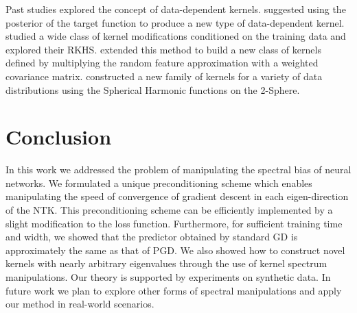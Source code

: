 \documentclass[10pt]{article} %
\theoremstyle{plain}
\theoremstyle{definition}
\theoremstyle{remark}
\begin{document}
Past studies explored the concept of data-dependent kernels. \citet{simon2022kernel} suggested using the posterior of the target function to produce a new type of data-dependent kernel. \citet{sindhwani2005beyond} studied a wide class of kernel modifications conditioned on the training data and explored their RKHS. \citet{ionescu2017large} extended this method to build a new class of kernels defined by multiplying the random feature approximation with a weighted covariance matrix. \citet{kennedy2013classification} constructed a new family of kernels for a variety of data distributions using the Spherical Harmonic functions on the 2-Sphere.

\section{Conclusion}

In this work we addressed the problem of manipulating the spectral bias of neural networks. We formulated a unique preconditioning scheme which enables manipulating the speed of convergence of gradient descent in each eigen-direction of the NTK. This preconditioning scheme can be efficiently implemented by a slight modification to the loss function.  Furthermore, for sufficient training time and width, we showed that the predictor obtained by standard GD is approximately the same as that of PGD. We also showed how to construct novel kernels with nearly arbitrary eigenvalues through the use of kernel spectrum manipulations. Our theory is supported by experiments on synthetic data. In future work we plan to explore other forms of spectral manipulations and apply our method in real-world scenarios.


\end{document}
